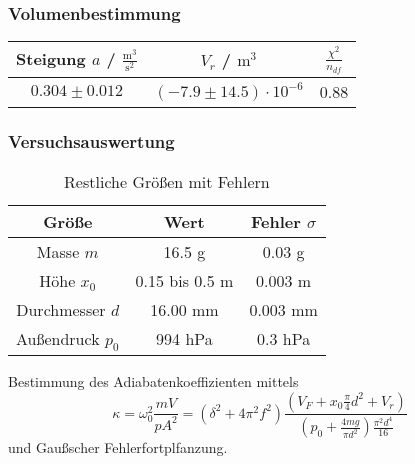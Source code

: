 \documentclass{beamer}
\begin{document}
\begin{frame}
\frametitle{Volumenbestimmung}

\begin{figure}
\centering
\end{figure}

\begin{table}
\begin{tabular}{|c|c|c|}
\hline
Steigung $a$ / $\frac{\mathrm m^3}{\mathrm s^2}$ & $V_r$ / $\mathrm m^3$ & $\frac{\chi^2}{n_{df}}$ \\
\hline
$0.304 \pm 0.012$ & $(-7.9 \pm 14.5) \cdot 10^{-6}$ & 0.88 \\
\hline
\end{tabular}
\end{table}

\end{frame}


\begin{frame}
\frametitle{Versuchsauswertung}

\begin{table}
\begin{tabular}{|c|c|c|}
\hline
Größe & Wert & Fehler $\sigma$ \\
\hline
Masse $m$ & 16.5 g & 0.03 g \\
\hline
Höhe $x_0$ & 0.15 bis 0.5 m & 0.003 m \\
\hline
Durchmesser $d$ & 16.00 mm & 0.003 mm \\
\hline
Außendruck $p_0$ & 994 hPa & 0.3 hPa \\
\hline
\end{tabular}
\caption{Restliche Größen mit Fehlern}
\end{table}
Bestimmung des Adiabatenkoeffizienten mittels
$$\kappa = \omega_0^2\frac{mV}{pA^2} = (\delta^2 + 4\pi^2 f^2) \frac{(V_F+x_0\frac{\pi}4 d^2 + V_r)}{(p_0+\frac{4mg}{\pi d^2})\frac{\pi^2d^4}{16}}$$
und Gaußscher Fehlerfortplfanzung.
\end{frame}
\end{document}
